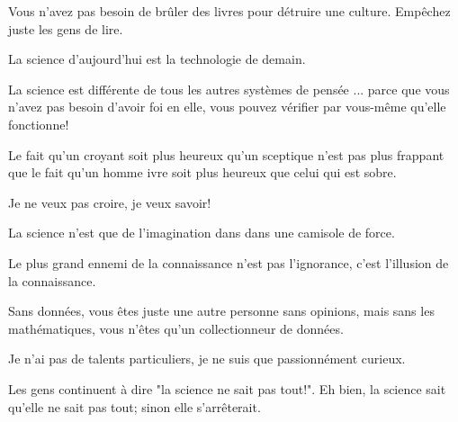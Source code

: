  	\begin{fquote}Vous n'avez pas besoin de brûler des livres pour détruire une culture. Empêchez juste les gens de lire.
 	\end{fquote}
 	
 	 \begin{fquote}La science d'aujourd'hui est la technologie de demain.
 	\end{fquote}
 	
 	 \begin{fquote}La science est différente de tous les autres systèmes de pensée ... parce que vous n'avez pas besoin d'avoir foi en elle, vous pouvez vérifier par vous-même qu'elle fonctionne!
 	\end{fquote}
 	
 	\begin{fquote}Le fait qu'un croyant soit plus heureux qu'un sceptique n'est pas plus frappant que le fait qu'un homme ivre soit plus heureux que celui qui est sobre.
 	\end{fquote}
 	
 	\begin{fquote}Je ne veux pas croire, je veux savoir!
 	\end{fquote}
 	
 	 \begin{fquote}La science n'est que de l'imagination dans dans une camisole de force.
 	\end{fquote}
 	
 	 \begin{fquote}Le plus grand ennemi de la connaissance n'est pas l'ignorance, c'est l'illusion de la connaissance.
 	\end{fquote}
 	
 	 \begin{fquote}[?]Sans données, vous êtes juste une autre personne sans opinions, mais sans les mathématiques, vous n'êtes qu'un collectionneur de données.
 	\end{fquote}
 	
 	\begin{fquote}Je n'ai pas de talents particuliers, je ne suis que passionnément curieux.
 	\end{fquote}

	\begin{fquote}Les gens continuent à dire "la science ne sait pas tout!". Eh bien, la science sait qu'elle ne sait pas tout; sinon elle s'arrêterait.
 	\end{fquote}
 

